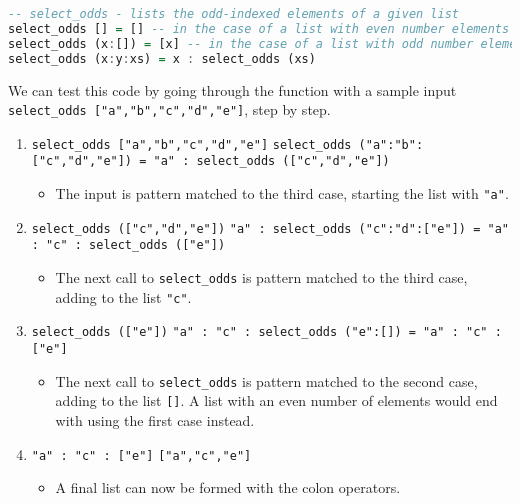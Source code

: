 \documentclass{article}
\theoremstyle{theorem}
\theoremstyle{definition}
\theoremstyle{remark}
\begin{document}
\begin{lstlisting}[language=Haskell]
-- select_odds - lists the odd-indexed elements of a given list
select_odds [] = [] -- in the case of a list with even number elements
select_odds (x:[]) = [x] -- in the case of a list with odd number elements
select_odds (x:y:xs) = x : select_odds (xs)
\end{lstlisting}
    
\noindent We can test this code by going through the function with a sample input \texttt{select\_odds ["a","b","c","d","e"]}, step by step.

\begin{enumerate}[noitemsep]
    \item \texttt{select\_odds ["a","b","c","d","e"]}
    \linebreak \texttt{select\_odds ("a":"b":["c","d","e"]) = "a" : select\_odds (["c","d","e"])}
    \begin{itemize}
        \item The input is pattern matched to the third case, starting the list with \texttt{"a"}.
    \end{itemize} 
    \item \texttt{select\_odds (["c","d","e"])}
    \linebreak \texttt{"a" : select\_odds ("c":"d":["e"]) = "a" : "c" : select\_odds (["e"])}
    \begin{itemize}
        \item The next call to \texttt{select\_odds} is pattern matched to the third case, adding to the list \texttt{"c"}.
    \end{itemize} 
    \item \texttt{select\_odds (["e"])}
    \linebreak \texttt{"a" : "c" : select\_odds ("e":[]) = "a" : "c" : ["e"]}
    \begin{itemize}
        \item The next call to \texttt{select\_odds} is pattern matched to the second case, adding to the list \texttt{[]}. A list with an even number of elements would end with using the first case instead.
    \end{itemize}
    \item \texttt{"a" : "c" : ["e"]}
    \linebreak \texttt{["a","c","e"]}
    \begin{itemize}
        \item A final list can now be formed with the colon operators.
    \end{itemize} 
\end{enumerate}
\end{document}
